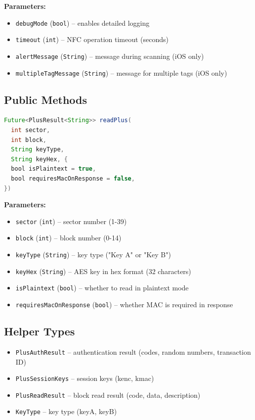 \documentclass[a4paper,12pt]{article}
\begin{document}
\textbf{Parameters:}
\begin{itemize}
    \item \texttt{debugMode} (\texttt{bool}) -- enables detailed logging
    \item \texttt{timeout} (\texttt{int}) -- NFC operation timeout (seconds)
    \item \texttt{alertMessage} (\texttt{String}) -- message during scanning (iOS only)
    \item \texttt{multipleTagMessage} (\texttt{String}) -- message for multiple tags (iOS only)
\end{itemize}

\subsection{Public Methods}
\begin{lstlisting}[language=Java]
Future<PlusResult<String>> readPlus(
  int sector,
  int block,
  String keyType,
  String keyHex, {
  bool isPlaintext = true,
  bool requiresMacOnResponse = false,
})
\end{lstlisting}

\textbf{Parameters:}
\begin{itemize}
    \item \texttt{sector} (\texttt{int}) -- sector number (1-39)
    \item \texttt{block} (\texttt{int}) -- block number (0-14)
    \item \texttt{keyType} (\texttt{String}) -- key type ("Key A" or "Key B")
    \item \texttt{keyHex} (\texttt{String}) -- AES key in hex format (32 characters)
    \item \texttt{isPlaintext} (\texttt{bool}) -- whether to read in plaintext mode
    \item \texttt{requiresMacOnResponse} (\texttt{bool}) -- whether MAC is required in response
\end{itemize}

\subsection{Helper Types}
\begin{itemize}
    \item \texttt{PlusAuthResult} -- authentication result (codes, random numbers, transaction ID)
    \item \texttt{PlusSessionKeys} -- session keys (kenc, kmac)
    \item \texttt{PlusReadResult} -- block read result (code, data, description)
    \item \texttt{KeyType} -- key type (keyA, keyB)
\end{itemize}
\end{document}
